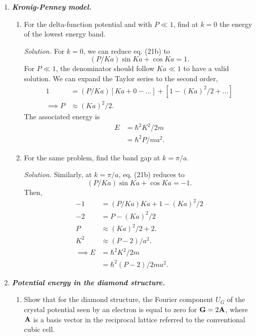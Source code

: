 \documentclass{homework}
\newcommand{\solution}{	\vspace{1em} \textit{Solution.} \quad }
\begin{document}
\begin{enumerate}
			
			
		\pagebreak

		\item %
			\textbf{\textit{Kronig-Penney model.}} \begin{enumerate}
				\item For the delta-function potential and with $P \ll 1$, find at $k=0$ the energy of the lowest energy band.
				
					\solution For $k=0$, we can reduce eq. (21b) to $$(P/Ka) \sin Ka + \cos Ka = 1.$$
					For $P\ll 1$, the denominator should follow $Ka \ll 1$ to have a valid solution. We can expand the Taylor series to the second order,
					\begin{align*}
						1 & = (P/Ka) \left[Ka + 0 - \dots\right] + \left[1 - (Ka)^2 / 2 + \dots \right] \\
						\implies P & \approx (Ka)^2 / 2.
					\end{align*}
					The associated energy is \begin{align*}
						E & = \hbar^2 K^2 / 2m \tag{13} \\
							& = \hbar^2 P / m  a^2.
					\end{align*}
						
				
				\item For the same problem, find the band gap at $k=\pi/a$.
				
					\solution Similarly, at $k=\pi/a$, eq. (21b) reduces to $$(P/Ka) \sin Ka + \cos Ka = -1.$$
					Then, \begin{align*}
						-1 & = (P/Ka) Ka + 1 - (Ka)^2 / 2 \\
						-2 & = P - (Ka)^2 / 2 \\
						P & \approx (Ka)^2 / 2 + 2. \\
						K^2 & \approx (P - 2) / a^2.\\
						\implies E & =  \hbar^2 K^2 / 2m \\
							& = \hbar^2(P-2) / 2 m a^2.
					\end{align*}
			\end{enumerate}
		
		\pagebreak
		
		\item %
			\textbf{\textit{Potential energy in the diamond structure.}} \begin{enumerate}
				\item Show that for the diamond structure, the Fourier component $U_G$ of the crystal potential seen by an electron is equal to zero for $\boldsymbol{\mathrm{G}}=2\boldsymbol{\mathrm{A}}$, where $\boldsymbol{\mathrm{A}}$ is a basis vector in the reciprocal lattice referred to the conventional cubic cell.
				

\end{enumerate}
\end{enumerate}
\end{document}

